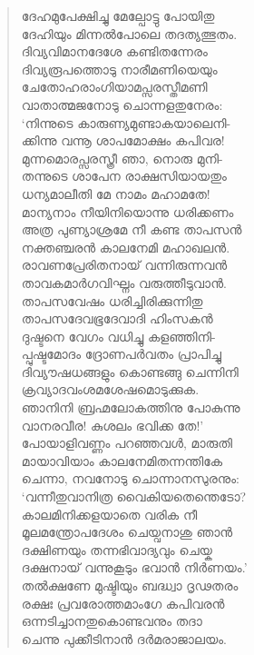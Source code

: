 \begin{verse}
ദേഹമുപേക്ഷിച്ചു മേല്പോട്ടു പോയിതു\\
ദേഹിയും മിന്നല്‍പോലെ തദത്യത്ഭുതം.\\
ദിവ്യവിമാനദേശേ കണ്ടിതന്നേരം\\
ദിവ്യരൂപത്തൊടു നാരീമണിയെയും\\
ചേതോഹരാംഗിയാമപ്സരസ്തീമണി\\
വാതാത്മജനോടു ചൊന്നളതുനേരം:\\
‘നിന്നുടെ കാരുണ്യമുണ്ടാകയാലെനി-\\
ക്കിന്നു വന്നൂ ശാപമോക്ഷം കപിവര!\\
മുന്നമൊരപ്സരസ്ത്രീ ഞാ, നൊരു മുനി-\\
തന്നുടെ ശാപേന രാക്ഷസിയായതും\\
ധന്യമാലീതി മേ നാമം മഹാമതേ!\\
മാന്യനാം നീയിനിയൊന്നു ധരിക്കണം\\
അത്ര പുണ്യാശ്രമേ നീ കണ്ട താപസന്‍\\
നക്തഞ്ചരന്‍ കാലനേമി മഹാഖലന്‍.\\
രാവണപ്രേരിതനായ് വന്നിരുന്നവന്‍\\
താവകമാര്‍ഗവിഘ്നം വരുത്തീടുവാന്‍.\\
താപസവേഷം ധരിച്ചിരിക്കുന്നിതു\\
താപസദേവഭൂദേവാദി ഹിംസകന്‍\\
ദുഷ്ടനെ വേഗം വധിച്ചു കളഞ്ഞിനി-\\
പ്പുഷ്ടമോദം ദ്രോണപര്‍വതം പ്രാപിച്ചു\\
ദിവ്യൗഷധങ്ങളും കൊണ്ടങ്ങു ചെന്നിനി\\
ക്രവ്യാദവംശമശേഷമൊടുക്കുക.\\
ഞാനിനി ബ്രഹ്മലോകത്തിനു പോകുന്നു\\
വാനരവീര! കുശലം ഭവിക്ക തേ!’\\
പോയാളിവണ്ണം പറഞ്ഞവള്‍, മാരുതി\\
മായാവിയാം കാലനേമിതന്നന്തികേ\\
ചെന്നാ, നവനോടു ചൊന്നാനസുരനും:\\
‘വന്നീതുവാനിത്ര വൈകിയതെന്തെടോ?\\
കാലമിനിക്കളയാതെ വരിക നീ\\
മൂലമന്ത്രോപദേശം ചെയ്വനാശു ഞാന്‍\\
ദക്ഷിണയും തന്നഭിവാദ്യവും ചെയ്ക\\
ദക്ഷനായ് വന്നുകൂടും ഭവാന്‍ നിര്‍ണയം.’\\
തല്‍ക്ഷണേ മുഷ്ടിയും ബദ്ധ്വാ ദൃഢതരം\\
രക്ഷഃ പ്രവരോത്തമാംഗേ കപിവരന്‍\\
ഒന്നടിച്ചാനതുകൊണ്ടവനും തദാ\\
ചെന്നു പുക്കീടിനാന്‍ ദര്‍മരാജാലയം.
\end{verse}

